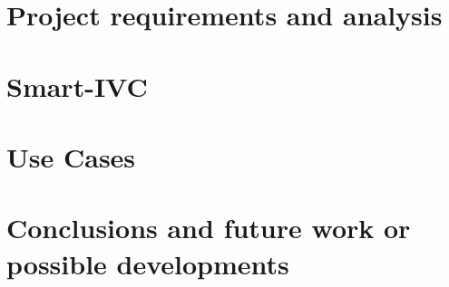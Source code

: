\documentclass[]{usiinfbachelorproject}
\newcommand{\applicationName}{Smart-IVC}
\begin{document}
\section{Project requirements and analysis} \label{projectRequirementsAndAnalysis}

\section{\applicationName} \label{projectDesign}

\section{Use Cases} \label{tests}

\section{Conclusions and future work or possible developments} \label{conclusions}






\end{document}
